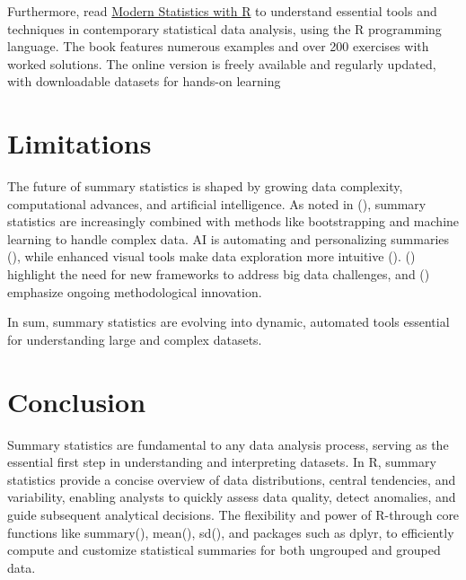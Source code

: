 \documentclass[
  man,
  floatsintext,
  longtable,
  nolmodern,
  notxfonts,
  notimes,
  colorlinks=true,linkcolor=blue,citecolor=blue,urlcolor=blue]{apa7}
\begin{document}
Furthermore, read
\href{https://modernstatisticswithr.com/index.html}{Modern Statistics
with R} to understand essential tools and techniques in contemporary
statistical data analysis, using the R programming language. The book
features numerous examples and over 200 exercises with worked solutions.
The online version is freely available and regularly updated, with
downloadable datasets for hands-on learning

\vspace{1cm}

\section{Limitations}\label{limitations}

The future of summary statistics is shaped by growing data complexity,
computational advances, and artificial intelligence. As noted in
(), summary
statistics are increasingly combined with methods like bootstrapping and
machine learning to handle complex data. AI is automating and
personalizing summaries (), while enhanced visual tools make data exploration more intuitive
().
() highlight the need
for new frameworks to address big data challenges, and
() emphasize
ongoing methodological innovation.

In sum, summary statistics are evolving into dynamic, automated tools
essential for understanding large and complex datasets.

\newpage

\section{Conclusion}\label{conclusion}

Summary statistics are fundamental to any data analysis process, serving
as the essential first step in understanding and interpreting datasets.
In R, summary statistics provide a concise overview of data
distributions, central tendencies, and variability, enabling analysts to
quickly assess data quality, detect anomalies, and guide subsequent
analytical decisions. The flexibility and power of R-through core
functions like summary(), mean(), sd(), and packages such as dplyr, to
efficiently compute and customize statistical summaries for both
ungrouped and grouped data.
\end{document}
